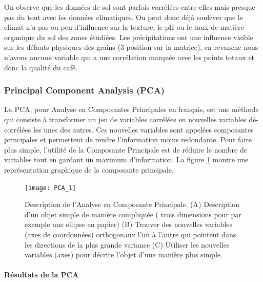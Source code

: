 \noindent On observe que les données de sol sont parfois corrélées entre-elles mais presque pas du tout avec les données climatiques. On peut donc déjà soulever que le climat n'a pas ou peu d'influence sur la texture, le pH ou le taux de matière organique du sol des zones étudiées. Les précipitations ont une influence visible sur les défauts physiques des grains (3 position sur la matrice), en revanche nous n'avons aucune variable qui a une corrélation marquée avec les points totaux et donc la qualité du café.   




\newpage
\subsubsection{Principal Component Analysis (PCA)}\label{PCAss}
La PCA, pour Analyse en Composantes Principales en français, est une méthode qui consiste à transformer un jeu de variables corrélées en nouvelles variables dé-corrélées les unes des autres. Ces nouvelles variables sont appelées composantes principales et permettent de rendre l'information moins redondante. Pour faire plus simple, l'utilité de la Composante Principale est de réduire le nombre de variables tout en gardant un maximum d'information. La figure \ref{PCAdefinition} montre une représentation graphique de la composante principale. 


\begin{figure}[H]
	\texttt{[image: PCA\_1]}
	\caption{\label{PCAdefinition} Description de l'Analyse en Composante Principale. (A) Description d'un objet simple de manière compliquée ( trois dimensions pour par exemple une ellipse en papier) (B) Trouver des nouvelles variables (axes de coordonnées) orthogonaux l'un à l'autre qui pointent dans les directions de la plus grande variance (C) Utiliser les nouvelles variables (axes) pour décrire l'objet d'une manière plus simple. }
\end{figure}

\paragraph{Résultats de la PCA}

